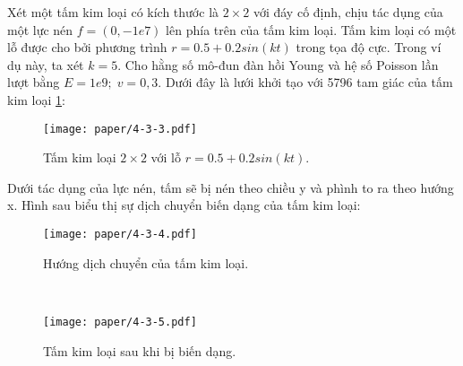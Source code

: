 \documentclass[
12pt, %
oneside, %
english, %
onehalfspacing, %
nolistspacing, %
headsepline, %
addchap,
]{MastersDoctoralThesis} %
\begin{document}
Xét một tấm kim loại có kích thước là $2 \times 2$ với đáy cố định, chịu tác dụng của một lực nén $f = (0,-1e7)$ lên phía trên của tấm kim loại. Tấm kim loại có một lỗ được cho bởi phương trình $r = 0.5 + 0.2 sin(kt)$ trong tọa độ cực. Trong ví dụ này, ta xét $k=5$. Cho hằng số mô-đun đàn hồi Young và hệ số Poisson lần lượt bằng $E=1e9;\; v=0,3$. Dưới đây là lưới khởi tạo với 5796 tam giác của tấm kim loại \ref{fig:exam33}:\\

\begin{figure}[http]
\centering
\texttt{[image: paper/4-3-3.pdf]}
\caption{Tấm kim loại $2 \times 2$ với lỗ $r = 0.5 + 0.2 sin(kt)$.}
\label{fig:exam33}
\end{figure}
Dưới tác dụng của lực nén, tấm sẽ bị nén theo chiều y và phình to ra theo hướng x. Hình sau biểu thị sự dịch chuyển biến dạng của tấm kim loại:\\
\begin{figure}[http]
\centering
\texttt{[image: paper/4-3-4.pdf]}
\caption{Hướng dịch chuyển của tấm kim loại.}
\label{fig:exam34}
\end{figure}\\
\begin{figure}[http]
\centering
\texttt{[image: paper/4-3-5.pdf]}
\caption{Tấm kim loại sau khi bị biến dạng.}
\label{fig:exam35}
\end{figure}\\
\end{document}
